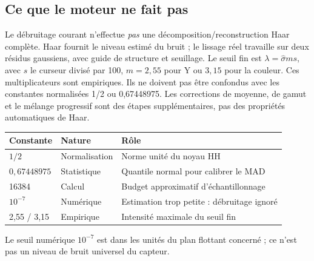\subsection{Ce que le moteur ne fait pas}
Le débruitage courant n'effectue \emph{pas} une décomposition/reconstruction
Haar complète. Haar fournit le niveau estimé du bruit ; le lissage réel
travaille sur deux résidus gaussiens, avec guide de structure et seuillage.
Le seuil fin est $\lambda=\widehat\sigma m s$, avec $s$ le curseur divisé
par 100, $m=2{,}55$ pour Y ou $3{,}15$ pour la couleur.
Ces multiplicateurs sont empiriques. Ils ne doivent pas être confondus avec
les constantes normalisées 1/2 ou 0,67448975.
Les corrections de moyenne, de gamut et le mélange progressif sont des
étapes supplémentaires, pas des propriétés automatiques de Haar.

\begin{center}
\begin{tabular}{lll}
\toprule Constante & Nature & Rôle \\ \midrule
$1/2$ & Normalisation & Norme unité du noyau HH \\
$0{,}67448975$ & Statistique & Quantile normal pour calibrer le MAD \\
16384 & Calcul & Budget approximatif d'échantillonnage \\
$10^{-7}$ & Numérique & Estimation trop petite : débruitage ignoré \\
2,55 / 3,15 & Empirique & Intensité maximale du seuil fin \\
\bottomrule
\end{tabular}
\end{center}
Le seuil numérique $10^{-7}$ est dans les unités du plan flottant concerné ;
ce n'est pas un niveau de bruit universel du capteur.

